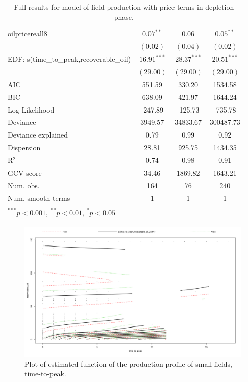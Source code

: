 \documentclass[12pt]{article}
\begin{document}
\begin{table}
\begin{center}
\begin{tabular}{l c c c }
oilpricereall8                    & $0.07^{**}$   & $0.06$        & $0.05^{**}$   \\
                                     & $(0.02)$      & $(0.04)$      & $(0.02)$      \\
EDF: s(time_to_peak,recoverable_oil) & $16.91^{***}$ & $28.37^{***}$ & $20.51^{***}$ \\
                                     & $(29.00)$     & $(29.00)$     & $(29.00)$     \\
\hline
AIC                                  & 551.59        & 330.20        & 1534.58       \\
BIC                                  & 638.09        & 421.97        & 1644.24       \\
Log Likelihood                       & -247.89       & -125.73       & -735.78       \\
Deviance                             & 3949.57       & 34833.67      & 300487.73     \\
Deviance explained                   & 0.79          & 0.99          & 0.92          \\
Dispersion                           & 28.81         & 925.75        & 1434.35       \\
R$^2$                                & 0.74          & 0.98          & 0.91          \\
GCV score                            & 34.46         & 1869.82       & 1643.21       \\
Num. obs.                            & 164           & 76            & 240           \\
Num. smooth terms                    & 1             & 1             & 1             \\
\hline
\multicolumn{4}{l}{\scriptsize{\textsuperscript{***}$p<0.001$, 
  \textsuperscript{**}$p<0.01$, 
  \textsuperscript{*}$p<0.05$}}
\end{tabular}
\caption{Full results for model of field production with price terms in depletion phase.}
\label{table:prepeak}
\end{center}
\end{table}


\begin{figure}
	\includegraphics[width=.8\textwidth]{figures/gam_under_2d_plot_1.png}
	\caption{Plot of estimated function of the production profile of small fields, time-to-peak.}
	\label{chart:gam_under_2d_plot_1}
\end{figure}
\end{document}
